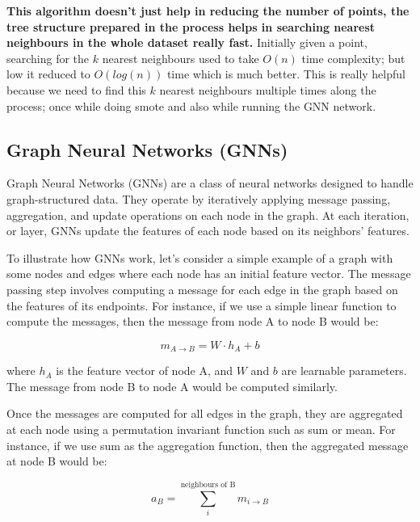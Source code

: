     \textbf{This algorithm doesn't just help in reducing the number of points, the tree structure prepared in the process helps in searching nearest neighbours in the whole dataset really fast.} Initially given a point, searching for the $k$ nearest neighbours used to take $O(n)$ time complexity; but low it reduced to $O(log(n))$ time which is much better. This is really helpful because we need to find this $k$ nearest neighbours multiple times along the process; once while doing smote and also while running the GNN network.


\subsection{Graph Neural Networks (GNNs)}\label{ssec:gnn}

    Graph Neural Networks (GNNs) are a class of neural networks designed to handle graph-structured data. They operate by iteratively applying message passing, aggregation, and update operations on each node in the graph. At each iteration, or layer, GNNs update the features of each node based on its neighbors' features.
    
    To illustrate how GNNs work, let's consider a simple example of a graph with some nodes and edges where each node has an initial feature vector. The message passing step involves computing a message for each edge in the graph based on the features of its endpoints. For instance, if we use a simple linear function to compute the messages, then the message from node A to node B would be:

\begin{equation}
    m_{A\rightarrow B} = W \cdot h_A + b
    \label{eq:message}
\end{equation}
    
    
    where $h_A$ is the feature vector of node A, and $W$ and $b$ are learnable parameters. The message from node B to node A would be computed similarly.
    
    Once the messages are computed for all edges in the graph, they are aggregated at each node using a permutation invariant function such as sum or mean. For instance, if we use sum as the aggregation function, then the aggregated message at node B would be:

    
    \begin{equation}
        a_B = \sum_i^{\text{neighbours of B}} m_{i\rightarrow B}
        \label{eq:aggreggate}
    \end{equation}
    
